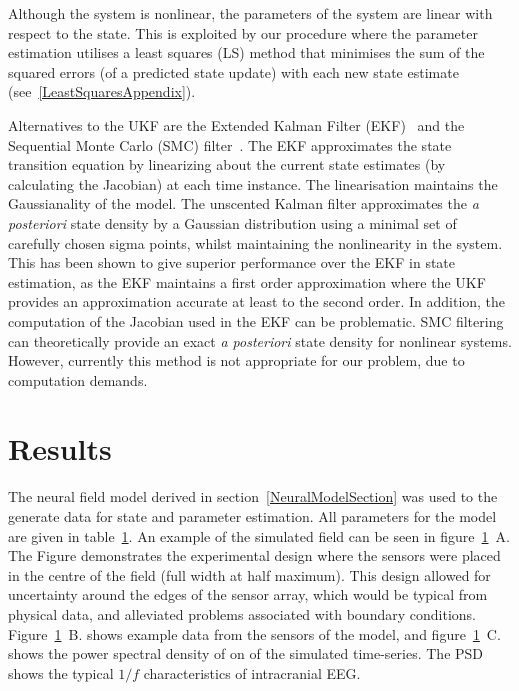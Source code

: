\documentclass[12pt]{iopart}
\begin{document}
Although the system is nonlinear, the parameters of the system are linear with respect to the state. This is exploited by our procedure where the parameter estimation utilises a least squares (LS) method that minimises the sum of the squared errors (of a predicted state update) with each new state estimate (see~\ref{LeastSquaresAppendix}).

Alternatives to the UKF are the Extended Kalman Filter (EKF)~\cite{Haykin2001} and the Sequential Monte Carlo (SMC) filter~\cite{doucet2001}. The EKF approximates the state transition equation by linearizing about the current state estimates (by calculating the Jacobian) at each time instance. The linearisation maintains the Gaussianality of the model. The unscented Kalman filter approximates the \emph{a posteriori} state density by a Gaussian distribution using a minimal set of carefully chosen sigma points, whilst maintaining the nonlinearity in the system. This has been shown to give superior performance over the EKF in state estimation, as the EKF maintains a first order approximation where the UKF provides an approximation accurate at least to the second order. In addition, the computation of the Jacobian used in the EKF can be problematic. SMC filtering can theoretically provide an exact \emph{a posteriori} state density for nonlinear systems. However, currently this method is not appropriate for our problem, due to computation demands. 

\section{Results} The neural field model derived in section~\ref{NeuralModelSection} was used to the generate data for state and parameter estimation. All parameters for the model are given in table~\ref{}. An example of the simulated field can be seen in figure~\ref{}~A. The Figure demonstrates the experimental design where the sensors were placed in the centre of the field (full width at half maximum). This design allowed for uncertainty around the edges of the sensor array, which would be typical from physical data, and alleviated problems associated with boundary conditions. Figure~\ref{}~B. shows example data from the sensors of the model, and figure~\ref{}~C. shows the power spectral density of on of the simulated time-series. The PSD shows the typical $1/f$ characteristics of intracranial EEG.
\end{document}
